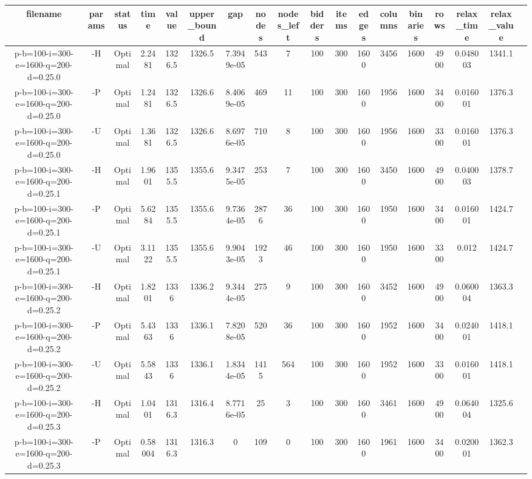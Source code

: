 \documentclass[landscape, a4paper]{article}
\begin{document}
\tiny

\begin{center}
\begin{tabular}{@{}cccccccccccccccccc@{}}
filename & params & status & time & value & upper\_bound & gap & nodes & nodes\_left & bidders & items & edges & columns & binaries & rows & relax\_time & relax\_value & \\
\hline
p-b=100-i=300-e=1600-q=200-d=0.25.0 & -H & Optimal & 2.2481 & 1326.5 & 1326.5 & 7.3949e-05 & 543 & 7 & 100 & 300 & 1600 & 3456 & 1600 & 4900 & 0.048003 & 1341.1 & \\
p-b=100-i=300-e=1600-q=200-d=0.25.0 & -P & Optimal & 1.2481 & 1326.5 & 1326.6 & 8.4069e-05 & 469 & 11 & 100 & 300 & 1600 & 1956 & 1600 & 3400 & 0.016001 & 1376.3 & \\
p-b=100-i=300-e=1600-q=200-d=0.25.0 & -U & Optimal & 1.3681 & 1326.5 & 1326.6 & 8.6976e-05 & 710 & 8 & 100 & 300 & 1600 & 1956 & 1600 & 3300 & 0.016001 & 1376.3 & \\
p-b=100-i=300-e=1600-q=200-d=0.25.1 & -H & Optimal & 1.9601 & 1355.5 & 1355.6 & 9.3475e-05 & 253 & 7 & 100 & 300 & 1600 & 3450 & 1600 & 4900 & 0.040003 & 1378.7 & \\
p-b=100-i=300-e=1600-q=200-d=0.25.1 & -P & Optimal & 5.6284 & 1355.5 & 1355.6 & 9.7364e-05 & 2876 & 36 & 100 & 300 & 1600 & 1950 & 1600 & 3400 & 0.016001 & 1424.7 & \\
p-b=100-i=300-e=1600-q=200-d=0.25.1 & -U & Optimal & 3.1122 & 1355.5 & 1355.6 & 9.9043e-05 & 1923 & 46 & 100 & 300 & 1600 & 1950 & 1600 & 3300 & 0.012 & 1424.7 & \\
p-b=100-i=300-e=1600-q=200-d=0.25.2 & -H & Optimal & 1.8201 & 1336 & 1336.2 & 9.3444e-05 & 275 & 9 & 100 & 300 & 1600 & 3452 & 1600 & 4900 & 0.060004 & 1363.3 & \\
p-b=100-i=300-e=1600-q=200-d=0.25.2 & -P & Optimal & 5.4363 & 1336 & 1336.1 & 7.8208e-05 & 520 & 36 & 100 & 300 & 1600 & 1952 & 1600 & 3400 & 0.024001 & 1418.1 & \\
p-b=100-i=300-e=1600-q=200-d=0.25.2 & -U & Optimal & 5.5843 & 1336 & 1336.1 & 1.8344e-05 & 1415 & 564 & 100 & 300 & 1600 & 1952 & 1600 & 3300 & 0.016001 & 1418.1 & \\
p-b=100-i=300-e=1600-q=200-d=0.25.3 & -H & Optimal & 1.0401 & 1316.3 & 1316.4 & 8.7716e-05 & 25 & 3 & 100 & 300 & 1600 & 3461 & 1600 & 4900 & 0.064004 & 1325.6 & \\
p-b=100-i=300-e=1600-q=200-d=0.25.3 & -P & Optimal & 0.58004 & 1316.3 & 1316.3 & 0 & 109 & 0 & 100 & 300 & 1600 & 1961 & 1600 & 3400 & 0.020001 & 1362.3 & \\

\end{tabular}
\end{center}
\end{document}
